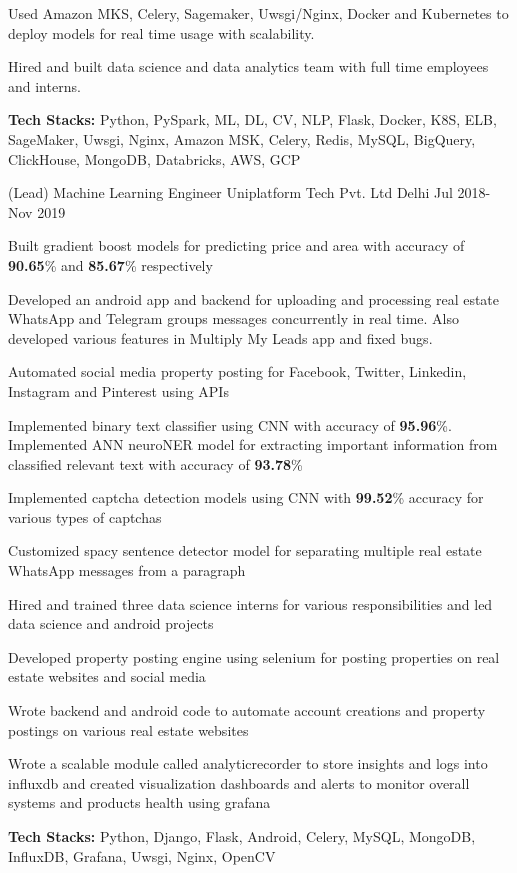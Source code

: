 \begin{cventries}
{\begin{cvitems}
        \item {Used Amazon MKS, Celery, Sagemaker, Uwsgi/Nginx, Docker and Kubernetes to deploy models for real time usage with scalability.}
        \item {Hired and built data science and data analytics team with full time employees and interns.}
        \item {\textbf{Tech Stacks:} Python, PySpark, ML, DL, CV, NLP, Flask, Docker, K8S, ELB, SageMaker, Uwsgi, Nginx, Amazon MSK, Celery, Redis, MySQL, BigQuery, ClickHouse, MongoDB, Databricks, AWS, GCP}
      \end{cvitems}
    }

  \cventry
    {(Lead) Machine Learning Engineer} %
    {Uniplatform Tech Pvt. Ltd} %
    {Delhi} %
    {Jul 2018- Nov 2019} %
    {
      \begin{cvitems} %
        \item{Built gradient boost models for predicting price and area with accuracy of \textbf{90.65}\% and \textbf{85.67}\% respectively}
        \item {Developed an android app and backend for uploading and processing real estate WhatsApp and Telegram groups messages concurrently in real time. Also developed various features in Multiply My Leads app and fixed bugs.}
        \item {Automated social media property posting for Facebook, Twitter, Linkedin, Instagram and Pinterest using APIs}
        \item {Implemented binary text classifier using CNN with accuracy of \textbf{95.96}\%. Implemented ANN neuroNER model for extracting important information from classified relevant text with accuracy of \textbf{93.78}\%}
        \item {Implemented captcha detection models using CNN with \textbf{99.52}\% accuracy for various types of captchas}
        \item {Customized spacy sentence detector model for separating multiple real estate WhatsApp messages from a paragraph}
        \item {Hired and trained three data science interns for various responsibilities and led data science and android projects}
        \item {Developed property posting engine using selenium for posting properties on real estate websites and social media}
        \item {Wrote backend and android code to automate account creations and property postings on various real estate websites}
        \item {Wrote a scalable module called analyticrecorder to store insights and logs into influxdb and created visualization dashboards and alerts to monitor overall systems and products health using grafana}
        \item {\textbf{Tech Stacks:} Python, Django, Flask, Android, Celery, MySQL, MongoDB, InfluxDB, Grafana, Uwsgi, Nginx, OpenCV}
      \end{cvitems}
    }


\end{cventries}
